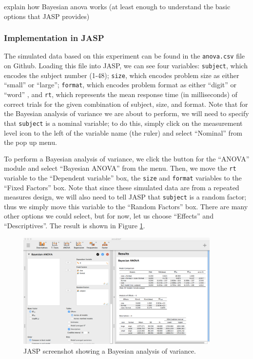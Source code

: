 \documentclass[english,,doc,floatsintext]{apa6}
\begin{document}
explain how Bayesian anova works (at least enough to understand the basic options that JASP provides)

\hypertarget{implementation-in-jasp-2}{%
\subsubsection{Implementation in JASP}\label{implementation-in-jasp-2}}

The simulated data based on this experiment can be found in the \texttt{anova.csv} file on Github. Loading this file into JASP, we can see four variables: \texttt{subject}, which encodes the subject number (1-48); \texttt{size}, which encodes problem size as either \enquote{small} or \enquote{large}; \texttt{format}, which encodes problem format as either \enquote{digit} or \enquote{word} , and \texttt{rt}, which represents the mean response time (in milliseconds) of correct trials for the given combination of subject, size, and format. Note that for the Bayesian analysis of variance we are about to perform, we will need to specify that \texttt{subject} is a nominal variable; to do this, simply click on the measurement level icon to the left of the variable name (the ruler) and select \enquote{Nominal} from the pop up menu.

To perform a Bayesian analysis of variance, we click the button for the \enquote{ANOVA} module and select \enquote{Bayesian ANOVA} from the menu. Then, we move the \texttt{rt} variable to the \enquote{Dependent variable} box, the \texttt{size} and \texttt{format} variables to the \enquote{Fixed Factors} box. Note that since these simulated data are from a repeated measures design, we will also need to tell JASP that \texttt{subject} is a random factor; thus we simply move this variable to the \enquote{Random Factors} box. There are many other options we could select, but for now, let us choose \enquote{Effects} and \enquote{Descriptives}. The result is shown in Figure \ref{fig:anovaBayes}.

\begin{figure}
\centering
\includegraphics[width=0.9\textwidth,height=\textheight]{figures/anovaBayes.png}
\caption{\label{fig:anovaBayes}JASP screenshot showing a Bayesian analysis of variance.}
\end{figure}
\end{document}
